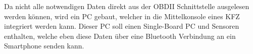 Da nicht alle notwendigen Daten direkt aus der OBDII Schnittstelle ausgelesen werden können, wird ein PC gebaut, welcher in die Mittelkonsole eines KFZ integriert werden kann.
Dieser PC soll einen Single-Board PC und Sensoren enthalten, welche eben diese Daten über eine Bluetooth Verbindung an ein Smartphone senden kann.


\clearpage %